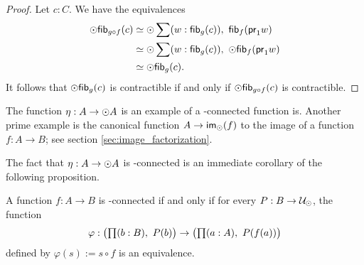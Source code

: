 \begin{proof}
Let $c:C$. We have the equivalences
\begin{align*}
\modal\hfib{g\circ f}c& \simeq \modal \sum(w:\hfib{g}c),\ \hfib{f}{\proj1 w}\\
& \simeq \modal\sum(w:\hfib{g}c),\ \modal\hfib{f}{\proj1 w}\\
& \simeq \modal\hfib{g}c.
\end{align*}
It follows that $\odot\mathsf{fib}_{g}(c)$ is contractible if and only if $\odot\mathsf{fib}_{g\circ f}(c)$ is
contractible.
\end{proof}

The function $\eta:A\to\odot A$ is an example of a \modal-connected function is. Another prime example is the
canonical function $A\to\mathsf{im}_{\odot}(f)$ to the image of a function $f:A\to B$; see section \ref{sec:image_factorization}.

The fact that $\eta:A\to\odot A$ is \modal-connected is an immediate corollary of the following proposition.

\begin{lem}\label{prop:nconnected_tested_by_lv_n_dependent types}
A function $f:A\to B$ is \modal-connected if and only if for every $P:B\to\mathcal{U}_{\odot}$, the function
\begin{equation*}
\varphi :\big(\prd{b:B} P(b)\big)\to\big(\prd{a:A}P(f(a))\big)
\end{equation*}
defined by $\varphi(s):=s\circ f$ is an equivalence.
\end{lem}

